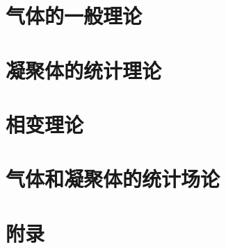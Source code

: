 \documentclass[lang=cn,device = normal,mode = fancy,black]{elegantbook}
\begin{document}
\part{气体的一般理论}


\part{凝聚体的统计理论}

\part{相变理论}

\part{气体和凝聚体的统计场论}

\appendix

\part{附录}

\end{document}

